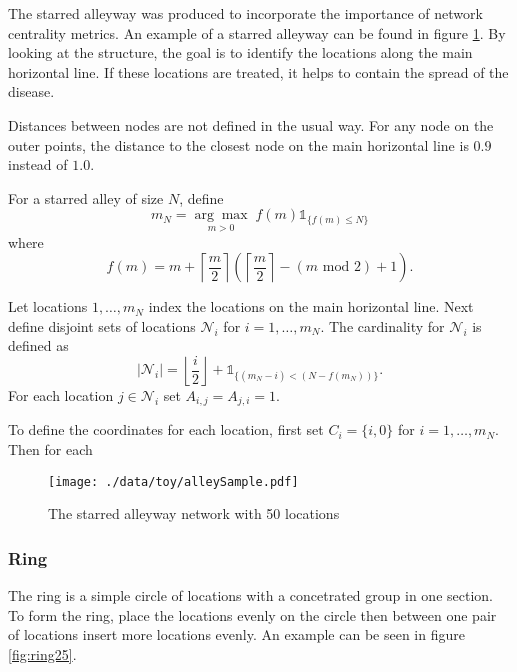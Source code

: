 \documentclass[11pt]{article}
\begin{document}
The starred alleyway was produced to incorporate the importance of
network centrality metrics.  An example of a starred alleyway can be
found in figure \ref{fig:alley25}.  By looking at the structure, the goal is
to identify the locations along the main horizontal line.  If these
locations are treated, it helps to contain the spread of the disease.

Distances between nodes are not defined in the usual way.  For any
node on the outer points, the distance to the closest node on the main
horizontal line is $0.9$ instead of $1.0$.

For a starred alley of size $N$, define
\begin{equation*}
  m_N = \underset{m > 0}{\arg\max} \; f(m) \mathds{1}_{\lbrace f(m) \le N
    \rbrace }
\end{equation*}
where
\begin{equation*}
  f(m) = m + \left\lceil \frac{m}{2}
  \right\rceil 
  \left(\left\lceil \frac{m}{2} \right\rceil
    - (m \text{ mod } 2) + 1 \right).
\end{equation*}

Let locations $1,\ldots,m_N$ index the locations on the main
horizontal line.  Next define disjoint sets of locations
$\mathcal{N}_i$ for $i = 1,\ldots,m_N$.  The cardinality for
$\mathcal{N}_i$ is defined as
\begin{equation*}
  | \mathcal{N}_i | = \left\lfloor \frac{i}{2} \right\rfloor +
  \mathds{1}_{\lbrace(m_N - i) < (N - f(m_N))\rbrace}.
\end{equation*}
For each location $j \in \mathcal{N}_i$ set $A_{i,j} = A_{j,i} = 1$.

To define the coordinates for each location, first set $C_{i} =
\lbrace i,0 \rbrace$ for $i = 1,\ldots,m_N$.  Then for each 


\begin{figure}[htb]
\centering
\texttt{[image: ./data/toy/alleySample.pdf]}
\caption{\label{fig:alley25}The starred alleyway network with 50 locations}
\end{figure}



\subsubsection{Ring}
\label{sec-3-1-3}

The ring is a simple circle of locations with a concetrated group in one
section.  To form the ring, place the locations evenly on the circle
then between one pair of locations insert more locations evenly.  An
example can be seen in figure \ref{fig:ring25}.
\end{document}
